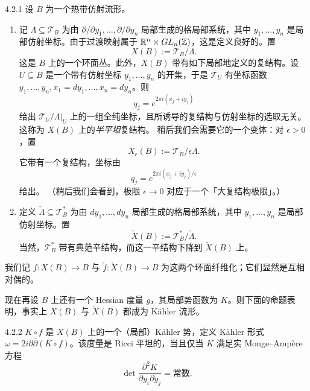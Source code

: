 \begin{definition}{4.2.1}
设 $B$ 为一个热带仿射流形。
\begin{enumerate}
\item 记 $\Lambda\subseteq\mathcal{T}_B$ 为由 $\partial/\partial y_1,\dots,\partial/\partial y_n$ 局部生成的格局部系统，其中 $y_1,\dots,y_n$ 是局部仿射坐标。由于过渡映射属于 $\mathbb{R}^n\times GL_n(\mathbb{Z})$，这是定义良好的。置  %
\[
X(B):=\mathcal{T}_B/\Lambda.
\]
这是 $B$ 上的一个环面丛。此外，$X(B)$ 带有如下局部地定义的复结构。设 $U\subseteq B$ 是一个带有仿射坐标 $y_1,\dots,y_n$ 的开集，于是 $\mathcal{T}_U$ 有坐标函数 $y_1,\dots,y_n,x_1=dy_1,\dots,x_n=dy_n$。则
\[
q_j=e^{2\pi i(x_j+iy_j)}
\]
给出 $\mathcal{T}_U/\Lambda|_U$ 上的一组全纯坐标，且所诱导的复结构与仿射坐标的选取无关。这称为 $X(B)$ 上的\emph{半平坦}复结构。
稍后我们会需要它的一个变体：对 $\epsilon>0$，置
\[
X_\epsilon(B):=\mathcal{T}_B/\epsilon\Lambda.
\]
它带有一个复结构，坐标由
\[
q_j=e^{2\pi i(x_j+iy_j)/\epsilon}
\]
给出。
（稍后我们会看到，极限 $\epsilon\to0$ 对应于一个「大复结构极限」。）
\item 定义 $\check\Lambda\subseteq\mathcal{T}_B^*$ 为由 $dy_1,\dots,dy_n$ 局部生成的格局部系统，其中 $y_1,\dots,y_n$ 是局部仿射坐标。置
\[
\check X(B):=\mathcal{T}_B^*/\check\Lambda.
\]
当然，$\mathcal{T}_B^*$ 带有典范辛结构，而这一辛结构下降到 $\check X(B)$ 上。\proofend
\end{enumerate}
\end{definition}

我们记 $f:X(B)\to B$ 与 $\check f:\check X(B)\to B$ 为这两个环面纤维化；它们显然是互相对偶的。

现在再设 $B$ 上还有一个 Hessian 度量 $g$，其局部势函数为 $K$。则下面的命题表明，事实上 $X(B)$ 与 $\check X(B)$ 都成为 Kähler 流形。

\begin{proposition}{4.2.2}
$K\circ f$ 是 $X(B)$ 上的一个（局部）Kähler 势，定义 Kähler 形式 $\omega=2i\partial\bar\partial(K\circ f)$。该度量是 Ricci 平坦的，当且仅当 $K$ 满足实 Monge--Ampère 方程
\[
\det\frac{\partial^2K}{\partial y_i\partial y_j}=\text{常数}.
\]
\end{proposition}


